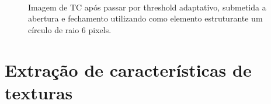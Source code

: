 \begin{figure}[ht]
 \begin{center}
  \\
 \end{center}
 \caption{Imagem de TC após passar por threshold adaptativo, submetida a abertura e fechamento utilizando como elemento estruturante um círculo de raio 6 pixels.}
 \label{fig:abertura_fechamento}
\end{figure}

\section{Extração de características de texturas}


